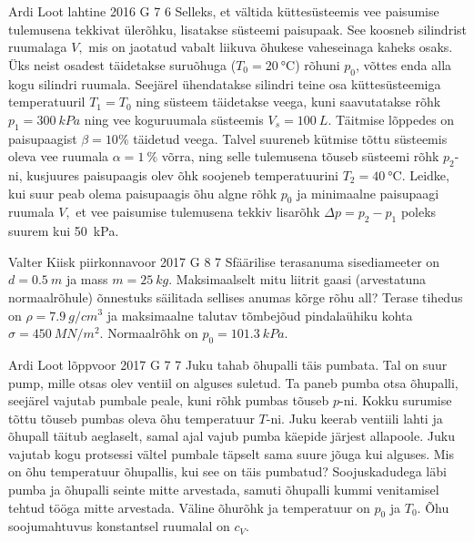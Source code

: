 \documentclass[11pt]{article}
\begin{document}
{%
{Ardi Loot} %
{lahtine} %
{2016} %
{G 7} %
{6} %
{
\ifStatement
Selleks, et vältida küttesüsteemis vee paisumise tulemusena tekkivat
ülerõhku, lisatakse süsteemi paisupaak. See koosneb silindrist ruumalaga
$V,$ mis on jaotatud vabalt liikuva õhukese vaheseinaga kaheks osaks. Üks
neist osadest täidetakse suruõhuga ($T_{0}=\SI{20}{\celsius}$)
rõhuni $p_{0}$, võttes enda alla kogu silindri ruumala. Seejärel ühendatakse silindri teine osa küttesüsteemiga temperatuuril $T_{1}=T_{0}$ ning süsteem täidetakse
veega, kuni saavutatakse rõhk $p_{1}=\SI{300}{kPa}$ ning vee koguruumala süsteemis $V_{s}=\SI{100}{L}$.
Täitmise lõppedes on paisupaagist $\beta=10\%$ täidetud veega. Talvel suureneb kütmise tõttu süsteemis oleva vee ruumala $\alpha=\SI{1}{\%}$ võrra, ning selle tulemusena tõuseb süsteemi rõhk $p_{2}$-ni, kusjuures paisupaagis olev õhk soojeneb temperatuurini $T_{2}=\SI{40}{\celsius}$. Leidke, kui suur peab olema paisupaagis
õhu algne rõhk $p_{0}$ ja minimaalne paisupaagi ruumala $V,$
et vee paisumise tulemusena tekkiv lisarõhk $\Delta p=p_{2}-p_{1}$
poleks suurem kui \SI{50}{kPa}. 
\fi
}

{Valter Kiisk} %
{piirkonnavoor} %
{2017} %
{G 8} %
{7} %
{
\ifStatement
Sfäärilise terasanuma sisediameeter on $d=\SI{0.5}{m}$ ja mass $m=\SI{25}{kg}$. Maksimaalselt mitu liitrit gaasi (arvestatuna normaalrõhule) õnnestuks säilitada sellises anumas kõrge rõhu all? Terase tihedus on $\rho=\SI{7.9}{g/cm^3}$ ja maksimaalne talutav tõmbejõud pindalaühiku kohta $\sigma=\SI{450}{MN/m^2}$. Normaalrõhk on $p_0=\SI{101.3}{kPa}$.
\fi
}

{Ardi Loot} %
{lõppvoor} %
{2017} %
{G 7} %
{7} %
{
\ifStatement
Juku tahab õhupalli täis pumbata. Tal on suur pump, mille otsas olev ventiil on alguses suletud. Ta paneb pumba otsa õhupalli, seejärel vajutab pumbale peale, kuni rõhk pumbas tõuseb $p$-ni. Kokku surumise tõttu tõuseb pumbas oleva õhu temperatuur $T$-ni. Juku keerab ventiili lahti ja õhupall täitub aeglaselt, samal ajal vajub pumba käepide järjest allapoole. Juku vajutab kogu protsessi vältel pumbale täpselt sama suure jõuga kui alguses. Mis on õhu temperatuur õhupallis, kui see on täis pumbatud? Soojuskadudega läbi pumba ja õhupalli seinte mitte arvestada, samuti õhupalli kummi venitamisel tehtud tööga mitte arvestada. Väline õhurõhk ja temperatuur on $p_0$ ja $T_0$. Õhu soojumahtuvus konstantsel ruumalal on $c_V$.
\fi
}

}
\end{document}
